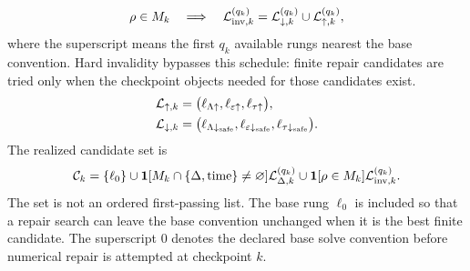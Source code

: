 \documentclass[
  reprint,
  amsmath,
  amssymb,
  aps,
  pra,
  nofootinbib,
  superscriptaddress,
  floatfix
]{revtex4-2}
\newcommand{\eps}{\varepsilon}
\begin{document}
\begin{equation}
\rho\in M_k
\quad\Longrightarrow\quad
\mathcal L_{{\rm inv},k}^{(q_k)}
=
\mathcal L_{\downarrow,k}^{(q_k)}
\cup
\mathcal L_{\uparrow,k}^{(q_k)} ,
\label{eq:inverse_response_schedule}
\end{equation}
where the superscript means the first $q_k$ available rungs nearest the base convention.  Hard invalidity bypasses this schedule: finite repair candidates are tried only when the checkpoint objects needed for those candidates exist.
\begin{equation}
\begin{aligned}
\mathcal L_{\uparrow,k}
&=
\bigl(\ell_{\Lambda\uparrow},\ell_{\eps\uparrow},\ell_{\tau\uparrow}\bigr),
\\
\mathcal L_{\downarrow,k}
&=
\bigl(\ell_{\Lambda\downarrow_{\rm safe}},
\ell_{\eps\downarrow_{\rm safe}},
\ell_{\tau\downarrow_{\rm safe}}\bigr).
\end{aligned}
\label{eq:repair_guard_lists}
\end{equation}
The realized candidate set is
\begin{equation}
\mathcal C_k
=
\{\ell_0\}
\cup
\mathbf 1[M_k\cap\{\Delta,{\rm time}\}\ne\varnothing]
\mathcal L_{\Delta,k}^{(q_k)}
\cup
\mathbf 1[\rho\in M_k]\mathcal L_{{\rm inv},k}^{(q_k)} .
\label{eq:repair_candidate_set}
\end{equation}
The set is not an ordered first-passing list.  The base rung $\ell_0$ is included so that a repair search can leave the base convention unchanged when it is the best finite candidate.  The superscript $0$ denotes the declared base solve convention before numerical repair is attempted at checkpoint $k$.
\end{document}
